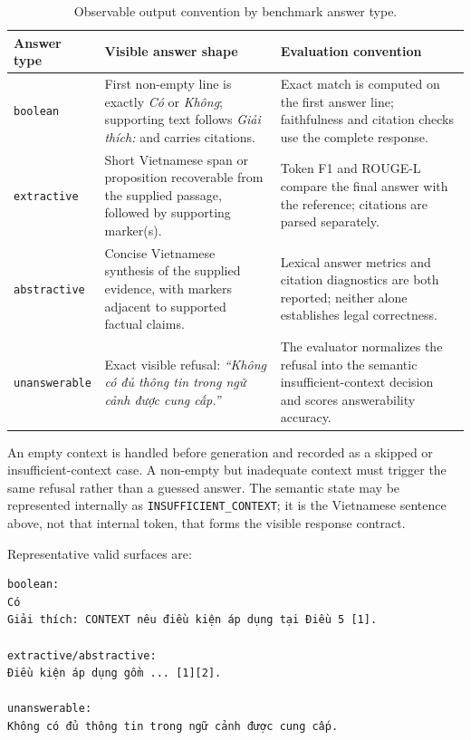 \begin{table}[t]
\centering
\scriptsize
\caption{Observable output convention by benchmark answer type.}
\label{tab:appendix-output-formats}
\begin{tabular}{p{}p{}p{}}
\toprule
\textbf{Answer type} & \textbf{Visible answer shape} & \textbf{Evaluation convention} \\
\midrule
\texttt{boolean} & First non-empty line is exactly \textit{Có} or \textit{Không}; supporting text follows \textit{Giải thích:} and carries citations. & Exact match is computed on the first answer line; faithfulness and citation checks use the complete response. \\
\texttt{extractive} & Short Vietnamese span or proposition recoverable from the supplied passage, followed by supporting marker(s). & Token F1 and ROUGE-L compare the final answer with the reference; citations are parsed separately. \\
\texttt{abstractive} & Concise Vietnamese synthesis of the supplied evidence, with markers adjacent to supported factual claims. & Lexical answer metrics and citation diagnostics are both reported; neither alone establishes legal correctness. \\
\texttt{unanswerable} & Exact visible refusal: \textit{``Không có đủ thông tin trong ngữ cảnh được cung cấp.''} & The evaluator normalizes the refusal into the semantic insufficient-context decision and scores answerability accuracy. \\
\bottomrule
\end{tabular}
\end{table}

An empty context is handled before generation and recorded as a skipped or
insufficient-context case. A non-empty but inadequate context must trigger the
same refusal rather than a guessed answer. The semantic state may be represented
internally as \texttt{INSUFFICIENT\_CONTEXT}; it is the Vietnamese sentence
above, not that internal token, that forms the visible response contract.

Representative valid surfaces are:

{\scriptsize
\begin{verbatim}
boolean:
Có
Giải thích: CONTEXT nêu điều kiện áp dụng tại Điều 5 [1].

extractive/abstractive:
Điều kiện áp dụng gồm ... [1][2].

unanswerable:
Không có đủ thông tin trong ngữ cảnh được cung cấp.
\end{verbatim}
}

